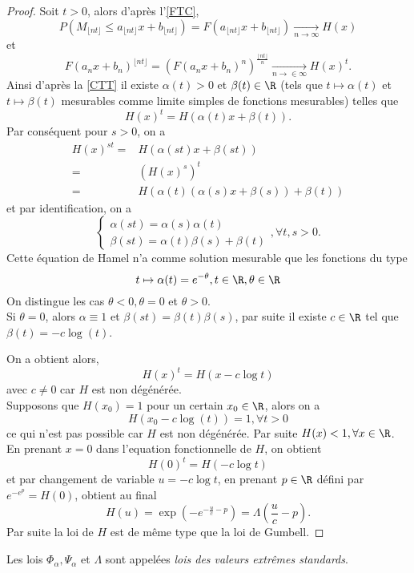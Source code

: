 \documentclass[10p,a4paper,reqno,titlepage]{report}
\begin{document}
\begin{proof}
	Soit $t >0$, alors d'après l'\autoref{FTC},
	$$P(M_{\lfloor nt \rfloor} \leq a_{\lfloor nt \rfloor} x + b_{\lfloor nt \rfloor}) = F(a_{\lfloor nt \rfloor} x + b_{\lfloor nt \rfloor}) \underset{n\to \infty}{\longrightarrow} H(x)$$
	et
	$$F(a_n x +b_n)^{\lfloor nt \rfloor} = \left( F(a_n x +b_n)^n\right)^{\frac{\lfloor nt \rfloor}{n}} \underset{n\to\in\infty}{\longrightarrow} H(x)^t.$$
	Ainsi d'après la \autoref{CTT} il existe $\alpha(t)>0$ et $\beta(t)\in\R$ (tels que $t \mapsto \alpha(t)$ et $t \mapsto \beta(t)$ mesurables comme limite simples de fonctions mesurables) telles que 
	$$ H(x)^t = H(\alpha(t)x +\beta(t)).$$
	Par conséquent pour $s>0$, on a 
	\begin{align*}
		H(x)^{st} = &  H(\alpha(st)x + \beta(st))\\
		= & (H(x)^s )^t \\
		= & H(\alpha(t)(\alpha(s)x +\beta(s))+\beta(t))
	\end{align*}
et par identification, on a 
$$\left\{ \begin{array}{l}
	\alpha(st) = \alpha(s)\alpha(t)\\
	\beta(st)= \alpha(t)\beta(s)+\beta(t)
\end{array}\right. ,\forall t,s >0.$$
Cette équation de Hamel n'a comme solution mesurable que les fonctions du type
$$ t \mapsto \alpha(t)= e^{-\theta}, t \in \R, \theta\in\R$$
On distingue les cas $\theta<0, \theta =0$ et $\theta >0$. \\
Si $\theta =0$, alors $\alpha \equiv 1$ et $\beta(st)=\beta(t)\beta(s)$, par suite il existe $c \in\R$ tel que $\beta(t)=- c \log(t)$.

On a obtient alors,
$$ H(x)^t = H(x -c\log t )$$
avec $c \neq 0$ car $H$ est non dégénérée. \\
Supposons que $H(x_0)= 1 $ pour un certain $x_0 \in \R$, alors on a 
 $$ H(x_0 - c\log(t))= 1 ,\forall t > 0$$
 ce qui n'est pas possible car $H$ est non dégénérée. Par suite $H(x) < 1,\forall x \in \R$.\\
 En prenant $x=0$ dans l'equation fonctionnelle de $H$, on obtient 
 $$ H(0)^t = H(- c\log t)$$
 et par changement de variable $u = - c\log t$, en prenant $p\in\R$ défini par $e^{-e ^p} =H(0)$, obtient au final
 $$H(u)= \exp(-e^{-\tfrac{u}{c}-p}) =\Lambda\left(\frac{u}{c}-p\right).$$
 Par suite la loi de $H$ est de même type que la loi de Gumbell.
\end{proof}

\begin{rem}
	Les lois $\Phi_\alpha, \Psi_\alpha$ et $\Lambda$ sont appelées \textit{lois des valeurs extrêmes standards}.
\end{rem}
\end{document}
